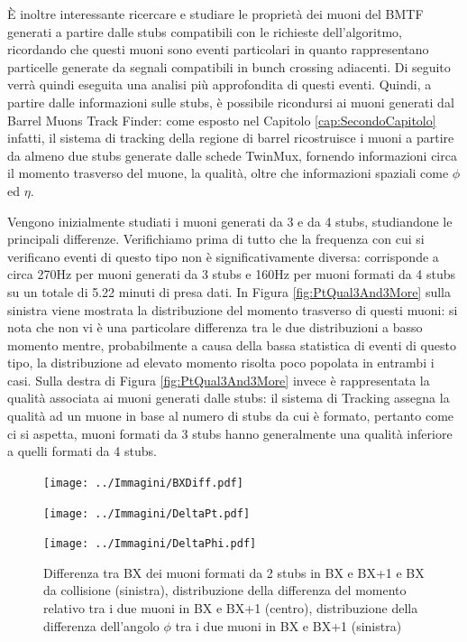È inoltre interessante ricercare e studiare le proprietà dei muoni del BMTF generati a partire dalle stubs compatibili con le richieste dell'algoritmo, ricordando che questi muoni sono eventi particolari in quanto rappresentano particelle generate da segnali compatibili in bunch crossing adiacenti. 
Di seguito verrà quindi eseguita una analisi più approfondita di questi eventi.\newline
Quindi, a partire dalle informazioni sulle stubs, è possibile ricondursi ai muoni generati dal Barrel Muons Track Finder: come esposto nel Capitolo \ref{cap:SecondoCapitolo} infatti, il sistema di tracking della regione di barrel ricostruisce i muoni a partire da almeno due stubs generate dalle schede TwinMux, fornendo informazioni circa il momento trasverso del muone, la qualità, oltre che informazioni spaziali come $\phi$ ed $\eta$. 

Vengono inizialmente studiati i muoni generati da 3 e da 4 stubs, studiandone le principali differenze. Verifichiamo prima di tutto che la frequenza con cui si verificano eventi di questo tipo non è significativamente diversa: corrisponde a circa 270Hz per muoni generati da 3 stubs e 160Hz per muoni formati da 4 stubs su un totale di 5.22 minuti di presa dati. In Figura \ref{fig:PtQual3And3More} sulla sinistra viene mostrata la distribuzione del momento trasverso di questi muoni: si nota che non vi è una particolare differenza tra le due distribuzioni a basso momento mentre, probabilmente a causa della bassa statistica di eventi di questo tipo, la distribuzione ad elevato momento risolta poco popolata in entrambi i casi. Sulla destra di Figura \ref{fig:PtQual3And3More} invece è rappresentata la qualità associata ai muoni generati dalle stubs: il sistema di Tracking assegna la qualità ad un muone in base al numero di stubs da cui è formato, pertanto come ci si aspetta, muoni formati da 3 stubs hanno generalmente una qualità inferiore a quelli formati da 4 stubs.


\begin{figure}[t]
  \centering
  \begin{minipage}{0.33\textwidth}
      \centering
      \texttt{[image: ../Immagini/BXDiff.pdf]}
  \end{minipage}%
  \hfill %
  \begin{minipage}{0.33\textwidth}
      \centering
      \texttt{[image: ../Immagini/DeltaPt.pdf]}
  \end{minipage}%
  \hfill
  \begin{minipage}{0.33\textwidth}
      \centering
      \texttt{[image: ../Immagini/DeltaPhi.pdf]}
  \end{minipage}
  \caption{Differenza tra BX dei muoni formati da 2 stubs in BX e BX+1 e BX da collisione (sinistra), distribuzione della differenza del momento relativo tra i due muoni in BX e BX+1 (centro), distribuzione della differenza dell'angolo $\phi$ tra i due muoni in BX e BX+1 (sinistra)}
  \label{fig:BXDiffAndPt}
\end{figure}

